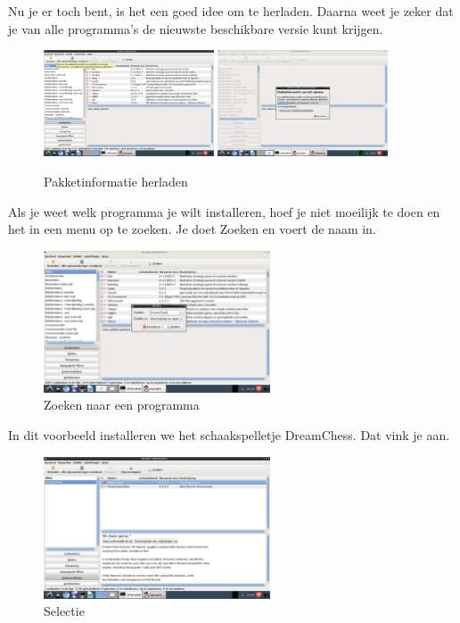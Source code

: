 \documentclass[12pt,a4paper]{article}
\begin{document}
\clearpage

\noindent Nu je er toch bent, is het een goed idee om te herladen. Daarna weet je zeker dat je van alle programma's de nieuwste beschikbare versie kunt krijgen.

\begin{figure} [H]
\centering
\includegraphics[width=0.45\textwidth]{plaatje04}
\includegraphics[width=0.45\textwidth]{plaatje05}
\caption{Pakketinformatie herladen}
\label{plaatje04}
\end{figure}

\noindent Als je weet welk programma je wilt installeren, hoef je niet moeilijk te doen en het in een menu op te zoeken. Je doet Zoeken en voert de naam in.

\begin{figure} [H]
\centering
\includegraphics[width=0.6\textwidth]{plaatje06}
\caption{Zoeken naar een programma}
\label{plaatje06}
\end{figure}

\noindent In dit voorbeeld installeren we het schaakspelletje DreamChess. Dat vink je aan.	

\begin{figure} [H]
\centering
\includegraphics[width=0.6\textwidth]{plaatje07}
\caption{Selectie}
\label{plaatje07}
\end{figure}
\end{document}
